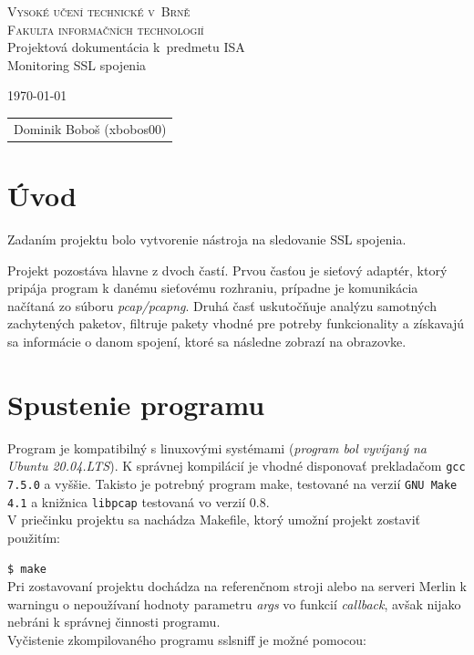 \documentclass[11pt, a4paper]{article}
\begin{document}
	\begin{titlepage}
		\begin{center}
			\Huge
			\textsc{Vysoké učení technické v~Brně} \\
			\huge
			\textsc{Fakulta informačních technologií} \\
			\LARGE
			Projektová dokumentácia k~predmetu ISA \\
			\Huge
			Monitoring SSL spojenia
		\end{center}

		{\Large
			\today
			\hfill
			\begin{tabular}{r}
			Dominik Boboš (xbobos00)
			\end{tabular}
		}
	\end{titlepage}
	
	\tableofcontents
	\newpage


	\section{Úvod}
	Zadaním projektu bolo vytvorenie nástroja na sledovanie SSL spojenia.
	
	Projekt pozostáva hlavne z dvoch častí. Prvou časťou je sieťový adaptér, ktorý pripája program k danému sieťovému rozhraniu, prípadne je komunikácia načítaná zo súboru \emph{pcap/pcapng}. Druhá časť uskutočňuje analýzu samotných zachytených paketov, filtruje pakety vhodné pre potreby funkcionality a získavajú sa informácie o danom spojení, ktoré sa následne zobrazí na obrazovke.
		
	\section{Spustenie programu}
	Program je kompatibilný s linuxovými systémami (\textit{program bol vyvíjaný na Ubuntu 20.04.LTS}). K správnej kompilácií je vhodné disponovať prekladačom \texttt{gcc 7.5.0} a vyššie. Takisto je potrebný program make, testované na verzií \texttt{GNU Make 4.1} a knižnica \texttt{libpcap} testovaná vo verzií 0.8.\\
V priečinku projektu sa nachádza Makefile, ktorý umožní projekt zostaviť použitím:

\texttt{\$ make}\\
Pri zostavovaní projektu dochádza na referenčnom stroji alebo na serveri Merlin k warningu o nepoužívaní hodnoty parametru \emph{args} vo funkcií \emph{callback}, avšak nijako nebráni k správnej činnosti programu.\\
Vyčistenie zkompilovaného programu sslsniff je možné pomocou:
\end{document}
